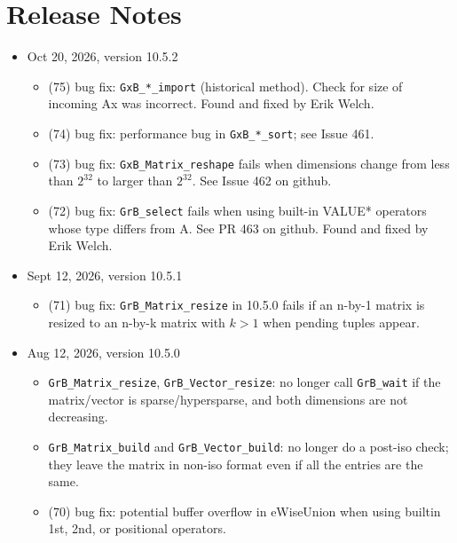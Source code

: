 
\section{Release Notes}

\begin{itemize}

\item Oct 20, 2026, version 10.5.2

    \begin{itemize}
    \item (75) bug fix: \verb'GxB_*_import' (historical method).  Check for
        size of incoming Ax was incorrect.  Found and fixed by Erik Welch.
    \item (74) bug fix: performance bug in \verb'GxB_*_sort'; see Issue 461.
    \item (73) bug fix: \verb'GxB_Matrix_reshape' fails when dimensions change
        from less than $2^{32}$ to larger than $2^{32}$.  See Issue 462 on
        github.
    \item (72) bug fix: \verb'GrB_select' fails when using built-in VALUE*
        operators whose type differs from A.  See PR 463 on github.
        Found and fixed by Erik Welch.
    \end{itemize}

\item Sept 12, 2026, version 10.5.1

    \begin{itemize}
    \item (71) bug fix: \verb'GrB_Matrix_resize' in 10.5.0 fails if an n-by-1
        matrix is resized to an n-by-k matrix with $k>1$ when pending tuples
        appear.
    \end{itemize}

\item Aug 12, 2026, version 10.5.0

    \begin{itemize}
    \item \verb'GrB_Matrix_resize', \verb'GrB_Vector_resize': no longer call
        \verb'GrB_wait' if the matrix/vector is sparse/hypersparse, and both
        dimensions are not decreasing.
    \item \verb'GrB_Matrix_build' and \verb'GrB_Vector_build': no longer do a
        post-iso check; they leave the matrix in non-iso format even if all the
        entries are the same.
    \item (70) bug fix:  potential buffer overflow in eWiseUnion when using
        builtin 1st, 2nd, or positional operators.
    \end{itemize}


\end{itemize}
